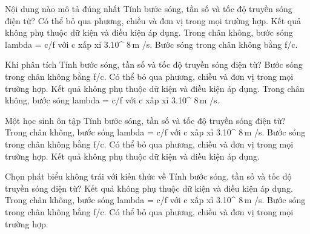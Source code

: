 \begin{ex}
Nội dung nào mô tả đúng nhất Tính bước sóng, tần số và tốc độ truyền sóng điện từ?
\choice
{Có thể bỏ qua phương, chiều và đơn vị trong mọi trường hợp.}
{Kết quả không phụ thuộc dữ kiện và điều kiện áp dụng.}
{\True Trong chân không, bước sóng lambda = c/f với c xấp xỉ 3.10^ $8\,\text{m}$ /s.}
{Bước sóng trong chân không bằng f/c.}
\end{ex}

\begin{ex}
Khi phân tích Tính bước sóng, tần số và tốc độ truyền sóng điện từ?
\choice
{Bước sóng trong chân không bằng f/c.}
{Có thể bỏ qua phương, chiều và đơn vị trong mọi trường hợp.}
{Kết quả không phụ thuộc dữ kiện và điều kiện áp dụng.}
{\True Trong chân không, bước sóng lambda = c/f với c xấp xỉ 3.10^ $8\,\text{m}$ /s.}
\end{ex}

\begin{ex}
Một học sinh ôn tập Tính bước sóng, tần số và tốc độ truyền sóng điện từ?
\choice
{\True Trong chân không, bước sóng lambda = c/f với c xấp xỉ 3.10^ $8\,\text{m}$ /s.}
{Bước sóng trong chân không bằng f/c.}
{Có thể bỏ qua phương, chiều và đơn vị trong mọi trường hợp.}
{Kết quả không phụ thuộc dữ kiện và điều kiện áp dụng.}
\end{ex}

\begin{ex}
Chọn phát biểu không trái với kiến thức về Tính bước sóng, tần số và tốc độ truyền sóng điện từ?
\choice
{Kết quả không phụ thuộc dữ kiện và điều kiện áp dụng.}
{\True Trong chân không, bước sóng lambda = c/f với c xấp xỉ 3.10^ $8\,\text{m}$ /s.}
{Bước sóng trong chân không bằng f/c.}
{Có thể bỏ qua phương, chiều và đơn vị trong mọi trường hợp.}
\end{ex}

